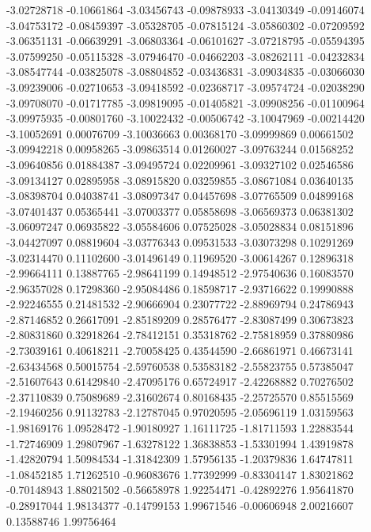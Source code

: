 -3.02728718  -0.10661864 
-3.03456743  -0.09878933 
-3.04130349  -0.09146074 
-3.04753172  -0.08459397 
-3.05328705  -0.07815124 
-3.05860302  -0.07209592 
-3.06351131  -0.06639291 
-3.06803364  -0.06101627 
-3.07218795  -0.05594395 
-3.07599250  -0.05115328 
-3.07946470  -0.04662203 
-3.08262111  -0.04232834 
-3.08547744  -0.03825078 
-3.08804852  -0.03436831 
-3.09034835  -0.03066030 
-3.09239006  -0.02710653 
-3.09418592  -0.02368717 
-3.09574724  -0.02038290 
-3.09708070  -0.01717785 
-3.09819095  -0.01405821 
-3.09908256  -0.01100964 
-3.09975935  -0.00801760 
-3.10022432  -0.00506742 
-3.10047969  -0.00214420 
-3.10052691  0.00076709  
-3.10036663  0.00368170  
-3.09999869  0.00661502  
-3.09942218  0.00958265  
-3.09863514  0.01260027  
-3.09763244  0.01568252  
-3.09640856  0.01884387  
-3.09495724  0.02209961  
-3.09327102  0.02546586  
-3.09134127  0.02895958  
-3.08915820  0.03259855  
-3.08671084  0.03640135  
-3.08398704  0.04038741  
-3.08097347  0.04457698  
-3.07765509  0.04899168  
-3.07401437  0.05365441  
-3.07003377  0.05858698  
-3.06569373  0.06381302  
-3.06097247  0.06935822  
-3.05584606  0.07525028  
-3.05028834  0.08151896  
-3.04427097  0.08819604  
-3.03776343  0.09531533  
-3.03073298  0.10291269  
-3.02314470  0.11102600  
-3.01496149  0.11969520  
-3.00614267  0.12896318  
-2.99664111  0.13887765  
-2.98641199  0.14948512  
-2.97540636  0.16083570  
-2.96357028  0.17298360  
-2.95084486  0.18598717  
-2.93716622  0.19990888  
-2.92246555  0.21481532  
-2.90666904  0.23077722  
-2.88969794  0.24786943  
-2.87146852  0.26617091  
-2.85189209  0.28576477  
-2.83087499  0.30673823  
-2.80831860  0.32918264  
-2.78412151  0.35318762  
-2.75818959  0.37880986  
-2.73039161  0.40618211  
-2.70058425  0.43544590  
-2.66861971  0.46673141  
-2.63434568  0.50015754  
-2.59760538  0.53583182  
-2.55823755  0.57385047  
-2.51607643  0.61429840  
-2.47095176  0.65724917  
-2.42268882  0.70276502  
-2.37110839  0.75089689  
-2.31602674  0.80168435  
-2.25725570  0.85515569  
-2.19460256  0.91132783  
-2.12787045  0.97020595  
-2.05696119  1.03159563  
-1.98169176  1.09528472  
-1.90180927  1.16111725  
-1.81711593  1.22883544  
-1.72746909  1.29807967  
-1.63278122  1.36838853  
-1.53301994  1.43919878  
-1.42820794  1.50984534  
-1.31842309  1.57956135  
-1.20379836  1.64747811  
-1.08452185  1.71262510  
-0.96083676  1.77392999  
-0.83304147  1.83021862  
-0.70148943  1.88021502  
-0.56658978  1.92254471  
-0.42892276  1.95641870  
-0.28917044  1.98134377  
-0.14799153  1.99671546  
-0.00606948  2.00216607  
0.13588746   1.99756464  
